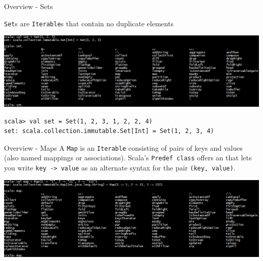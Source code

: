 \begin{frame}[fragile]{Overview - Sets}
\begin{center}
\lstinline!Set!s are \lstinline!Iterable!s that contain no duplicate elements
\end{center}
\begin{center}
\includegraphics[width = \textwidth]{resources/Set.png}
\end{center}
\begin{lstlisting}
scala> val set = Set(1, 2, 3, 1, 2, 2, 4)
set: scala.collection.immutable.Set[Int] = Set(1, 2, 3, 4)
\end{lstlisting}
\end{frame}

\begin{frame}[fragile]{Overview - Maps}
A \lstinline!Map! is an \lstinline!Iterable! consisting of pairs of keys and
values (also named mappings or associations). Scala's \lstinline!Predef class!
offers an  that lets you write \lstinline!key -> value! as
an alternate syntax for the pair \lstinline!(key, value)!.
\begin{center}
\includegraphics[width = \textwidth]{resources/Map.png}
\end{center}
\end{frame}

